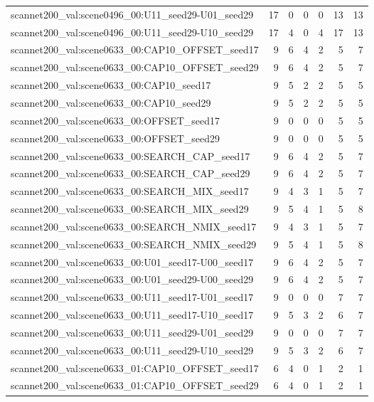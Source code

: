 \begin{table}[t]
\begin{tabular}{lrrrrrr}
scannet200\_val:scene0496\_00:U11\_seed29-U01\_seed29 & 17 & 0 & 0 & 0 & 13 & 13 \\
scannet200\_val:scene0496\_00:U11\_seed29-U10\_seed29 & 17 & 4 & 0 & 4 & 17 & 13 \\
scannet200\_val:scene0633\_00:CAP10\_OFFSET\_seed17 & 9 & 6 & 4 & 2 & 5 & 7 \\
scannet200\_val:scene0633\_00:CAP10\_OFFSET\_seed29 & 9 & 6 & 4 & 2 & 5 & 7 \\
scannet200\_val:scene0633\_00:CAP10\_seed17 & 9 & 5 & 2 & 2 & 5 & 5 \\
scannet200\_val:scene0633\_00:CAP10\_seed29 & 9 & 5 & 2 & 2 & 5 & 5 \\
scannet200\_val:scene0633\_00:OFFSET\_seed17 & 9 & 0 & 0 & 0 & 5 & 5 \\
scannet200\_val:scene0633\_00:OFFSET\_seed29 & 9 & 0 & 0 & 0 & 5 & 5 \\
scannet200\_val:scene0633\_00:SEARCH\_CAP\_seed17 & 9 & 6 & 4 & 2 & 5 & 7 \\
scannet200\_val:scene0633\_00:SEARCH\_CAP\_seed29 & 9 & 6 & 4 & 2 & 5 & 7 \\
scannet200\_val:scene0633\_00:SEARCH\_MIX\_seed17 & 9 & 4 & 3 & 1 & 5 & 7 \\
scannet200\_val:scene0633\_00:SEARCH\_MIX\_seed29 & 9 & 5 & 4 & 1 & 5 & 8 \\
scannet200\_val:scene0633\_00:SEARCH\_NMIX\_seed17 & 9 & 4 & 3 & 1 & 5 & 7 \\
scannet200\_val:scene0633\_00:SEARCH\_NMIX\_seed29 & 9 & 5 & 4 & 1 & 5 & 8 \\
scannet200\_val:scene0633\_00:U01\_seed17-U00\_seed17 & 9 & 6 & 4 & 2 & 5 & 7 \\
scannet200\_val:scene0633\_00:U01\_seed29-U00\_seed29 & 9 & 6 & 4 & 2 & 5 & 7 \\
scannet200\_val:scene0633\_00:U11\_seed17-U01\_seed17 & 9 & 0 & 0 & 0 & 7 & 7 \\
scannet200\_val:scene0633\_00:U11\_seed17-U10\_seed17 & 9 & 5 & 3 & 2 & 6 & 7 \\
scannet200\_val:scene0633\_00:U11\_seed29-U01\_seed29 & 9 & 0 & 0 & 0 & 7 & 7 \\
scannet200\_val:scene0633\_00:U11\_seed29-U10\_seed29 & 9 & 5 & 3 & 2 & 6 & 7 \\
scannet200\_val:scene0633\_01:CAP10\_OFFSET\_seed17 & 6 & 4 & 0 & 1 & 2 & 1 \\
scannet200\_val:scene0633\_01:CAP10\_OFFSET\_seed29 & 6 & 4 & 0 & 1 & 2 & 1 \\

\end{tabular}
\end{table}
